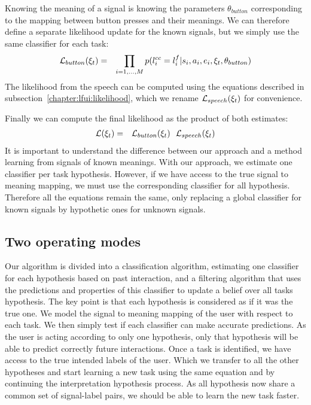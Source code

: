 Knowing the meaning of a signal is knowing the parameters $\theta_{button}$ corresponding to the mapping between button presses and their meanings. We can therefore define a separate likelihood update for the known signals, but we simply use the same classifier for each task:
%
\begin{eqnarray}
\mathcal{L}_{button}(\xi_t) &=& \prod_{i = 1,\ldots, M} p(l^{cc}_i = l^f_i | s_i, a_i, e_i, \xi_t, \theta_{button})
\end{eqnarray}
%
The likelihood from the speech can be computed using the equations described in subsection~\ref{chapter:lfui:likelihood}, which we rename $\mathcal{L}_{speech}(\xi_t)$ for convenience.

Finally we can compute the final likelihood as the product of both estimates:
%
\begin{eqnarray}
\mathcal{L}(\xi_t) &=& \mathcal{L}_{button}(\xi_t) ~~ \mathcal{L}_{speech}(\xi_t)
\end{eqnarray}
%
It is important to understand the difference between our approach and a method learning from signals of known meanings. With our approach, we estimate one classifier per task hypothesis. However, if we have access to the true signal to meaning mapping, we must use the corresponding classifier for all hypothesis. Therefore all the equations remain the same, only replacing a global classifier for known signals by hypothetic ones for unknown signals.

\subsection{Two operating modes}

Our algorithm is divided into a classification algorithm, estimating one classifier for each hypothesis based on past interaction, and a filtering algorithm that uses the predictions and properties of this classifier to update a belief over all tasks hypothesis. The key point is that each hypothesis is considered as if it was the true one. We model the signal to meaning mapping of the user with respect to each task. We then simply test if each classifier can make accurate predictions. As the user is acting according to only one hypothesis, only that hypothesis will be able to predict correctly future interactions. Once a task is identified, we have access to the true intended labels of the user. Which we transfer to all the other hypotheses and start learning a new task using the same equation and by continuing the interpretation hypothesis process. As all hypothesis now share a common set of signal-label pairs, we should be able to learn the new task faster.

